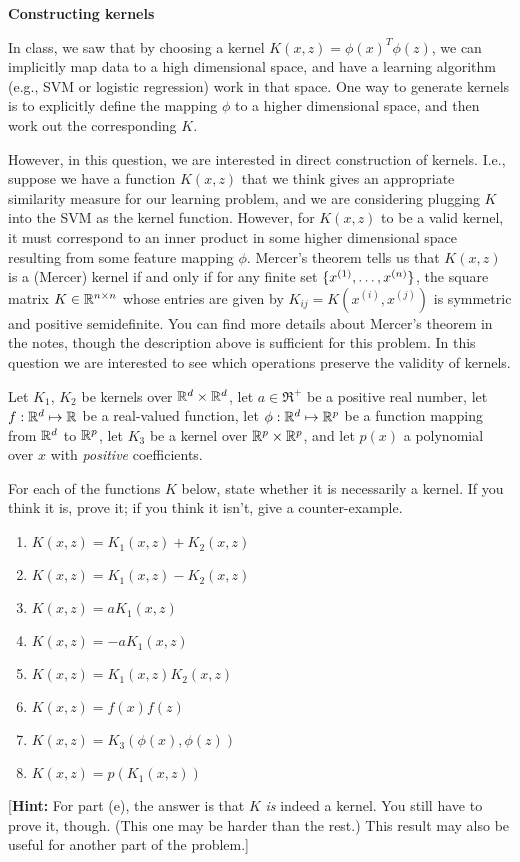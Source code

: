 \item {} {\bf Constructing kernels}

In class, we saw that by choosing a kernel $K(x,z) = \phi(x)^T\phi(z)$, we can
implicitly map data to a high dimensional space, and have a learning algorithm (e.g., SVM or logistic regression)
work in that space. One way to generate kernels is to explicitly define the
mapping $\phi$ to a higher dimensional space, and then work out the
corresponding $K$.

However, in this question, we are interested in direct construction of kernels.
I.e., suppose we have a function $K(x,z)$ that we think gives an appropriate
similarity measure for our learning problem, and we are considering plugging
$K$ into the SVM as the kernel function. However, for $K(x,z)$ to be a valid
kernel, it must correspond to an inner product in some higher dimensional space
resulting from some feature mapping $\phi$.  Mercer's theorem tells us that
$K(x,z)$ is a (Mercer) kernel if and only if for any finite set $\{x^{(1)},
\ldots, x^{({n})}\}$, the square matrix $K \in {\mathbb R}^{{n} \times {n}}$ whose entries
are given by $K_{ij} = K(x^{(i)},x^{(j)})$ is symmetric and positive
semidefinite. You can find more details about Mercer's theorem in the notes,
though the description above is sufficient for this problem.
%
In this question we are interested to see which operations preserve the validity of kernels. 
%

Let $K_1$, $K_2$ be kernels over ${\mathbb R}^{{d}} \times
{\mathbb R}^{{d}}$, let $a \in \Re^+$ be a positive real number, let $f: {\mathbb R}^{{d}} \mapsto
{\mathbb R}$ be a real-valued function, let $\phi: {\mathbb R}^{{d}} \mapsto {\mathbb R}^{p}$ be a
function mapping from ${\mathbb R}^{{d}}$ to ${\mathbb R}^{p}$, let $K_3$ be a kernel over ${\mathbb R}^{p}
\times {\mathbb R}^{p}$, and let $p(x)$ a polynomial over $x$ with \emph{positive}
coefficients.

For each of the functions $K$ below, state whether it is necessarily a
kernel.  If you think it is, prove it; if you think it isn't, give a
counter-example.

\begin{enumerate}

\item {} $K(x,z) = K_1(x,z) + K_2(x,z)$
\item {} $K(x,z) = K_1(x,z) - K_2(x,z)$
\item {} $K(x,z) = a K_1(x,z)$
\item {} $K(x,z) = -a K_1(x,z)$
\item {} $K(x,z) = K_1(x,z)K_2(x,z)$
\item {} $K(x,z) = f(x)f(z)$
\item {} $K(x,z) = K_3(\phi(x),\phi(z))$
\item {} $K(x,z) = p(K_1(x,z))$

\end{enumerate}

[\textbf{Hint:} For part (e), the answer is that $K$ \emph{is} indeed
a kernel. You still have to prove it, though.  (This one may be harder than the
rest.)  This result may also be useful for another part of the problem.]

\ifnum{} {
  
} \fi
